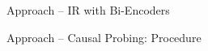 \documentclass[aspectratio=169]{beamer}
\begin{document}
\begin{frame}{Approach -- IR with Bi-Encoders}
    \begin{figure}[!ht]
        \centering
    \end{figure}
    \cite{TREC2019}
\end{frame}

\begin{frame}{Approach -- Causal Probing: Procedure}
    \begin{figure}[!ht]
        \centering
    \end{figure}
\end{frame}
\end{document}
